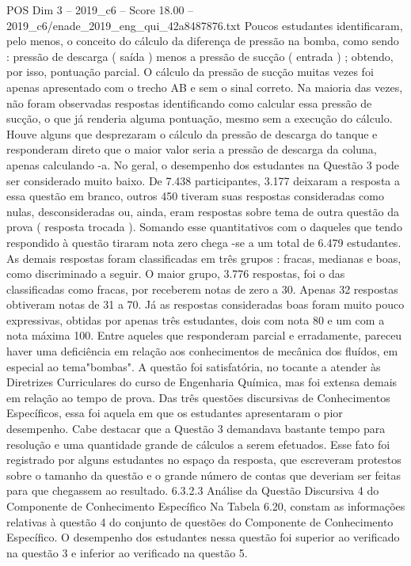 \begin{textsample}{POS Dim 3 – 2019\_c6 – Score 18.00 – 2019\_c6/enade\_2019\_eng\_qui\_42a8487876.txt}
Poucos estudantes identificaram, pelo menos, o conceito do cálculo da diferença de pressão na bomba, como sendo : pressão de descarga ( saída ) menos a pressão de sucção ( entrada ) ; obtendo, por isso, pontuação parcial.
O cálculo da pressão de sucção muitas vezes foi apenas apresentado com o trecho AB e sem o sinal correto.
Na maioria das vezes, não foram observadas respostas identificando como calcular essa pressão de sucção, o que já renderia alguma pontuação, mesmo sem a execução do cálculo.
Houve alguns que desprezaram o cálculo da pressão de descarga do tanque e responderam direto que o maior valor seria a pressão de descarga da coluna, apenas calculando -a.
No geral, o desempenho dos estudantes na Questão 3 pode ser considerado muito baixo.
De 7.438 participantes, 3.177 deixaram a resposta a essa questão em branco, outros 450 tiveram suas respostas consideradas como nulas, desconsideradas ou, ainda, eram respostas sobre tema de outra questão da prova ( resposta trocada ).
Somando esse quantitativos com o daqueles que tendo respondido à questão tiraram nota zero chega -se a um total de 6.479 estudantes.
As demais respostas foram classificadas em três grupos : fracas, medianas e boas, como discriminado a seguir.
O maior grupo, 3.776 respostas, foi o das classificadas como fracas, por receberem notas de zero a 30.
Apenas 32 respostas obtiveram notas de 31 a 70.
Já as respostas consideradas boas foram muito pouco expressivas, obtidas por apenas três estudantes, dois com nota 80 e um com a nota máxima 100.
Entre aqueles que responderam parcial e erradamente, pareceu haver uma deficiência em relação aos conhecimentos de mecânica dos fluídos, em especial ao tema"bombas".
A questão foi satisfatória, no tocante a atender às Diretrizes Curriculares do curso de Engenharia Química, mas foi extensa demais em relação ao tempo de prova.
Das três questões discursivas de Conhecimentos Específicos, essa foi aquela em que os estudantes apresentaram o pior desempenho.
Cabe destacar que a Questão 3 demandava bastante tempo para resolução e uma quantidade grande de cálculos a serem efetuados.
Esse fato foi registrado por alguns estudantes no espaço da resposta, que escreveram protestos sobre o tamanho da questão e o grande número de contas que deveriam ser feitas para que chegassem ao resultado. 6.3.2.3 Análise da Questão Discursiva 4 do Componente de Conhecimento Específico Na Tabela 6.20, constam as informações relativas à questão 4 do conjunto de questões do Componente de Conhecimento Específico.
O desempenho dos estudantes nessa questão foi superior ao verificado na questão 3 e inferior ao verificado na questão 5.

\end{textsample}
